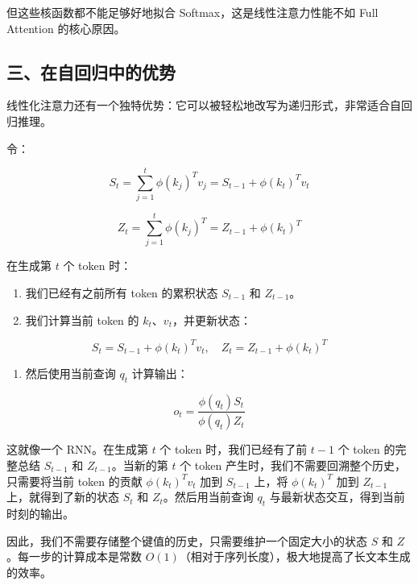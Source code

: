 但这些核函数都不能足够好地拟合 Softmax，这是线性注意力性能不如 Full Attention 的核心原因。

\hypertarget{ux4e09ux5728ux81eaux56deux5f52ux4e2dux7684ux4f18ux52bf}{%
\subsection{三、在自回归中的优势}\label{ux4e09ux5728ux81eaux56deux5f52ux4e2dux7684ux4f18ux52bf}}

线性化注意力还有一个独特优势：它可以被轻松地改写为递归形式，非常适合自回归推理。

令：

\[
S_t = \sum_{j=1}^{t}\phi(k_j)^T v_j
= S_{t-1}+\phi(k_t)^T v_t
\]

\[
Z_t = \sum_{j=1}^{t}\phi(k_j)^T
= Z_{t-1}+\phi(k_t)^T
\]

在生成第 \(t\) 个 token 时：

\begin{enumerate}
\def\labelenumi{\arabic{enumi}.}
\tightlist
\item
  我们已经有之前所有 token 的累积状态 \(S_{t-1}\) 和 \(Z_{t-1}\)。
\item
{}
  我们计算当前 token 的 \(k_t\)、\(v_t\)，并更新状态：
\end{enumerate}

\[
S_t = S_{t-1}+\phi(k_t)^T v_t,\quad
Z_t = Z_{t-1}+\phi(k_t)^T
\]

\begin{enumerate}
\def\labelenumi{\arabic{enumi}.}
\setcounter{enumi}{2}
\tightlist
\item
{}
  然后使用当前查询 \(q_t\) 计算输出：
\end{enumerate}

\[
o_t = \frac{\phi(q_t)S_t}{\phi(q_t)Z_t}
\]

这就像一个 RNN。在生成第 \(t\) 个 token 时，我们已经有了前 \(t-1\) 个 token 的完整总结 \(S_{t-1}\) 和 \(Z_{t-1}\)。当新的第 \(t\) 个 token 产生时，我们不需要回溯整个历史，只需要将当前 token 的贡献 \(\phi(k_t)^T v_t\) 加到 \(S_{t-1}\) 上，将 \(\phi(k_t)^T\) 加到 \(Z_{t-1}\) 上，就得到了新的状态 \(S_t\) 和 \(Z_t\)。然后用当前查询 \(q_t\) 与最新状态交互，得到当前时刻的输出。

因此，我们不需要存储整个键值的历史，只需要维护一个固定大小的状态 \(S\) 和 \(Z\)。每一步的计算成本是常数 \(O(1)\)（相对于序列长度），极大地提高了长文本生成的效率。

